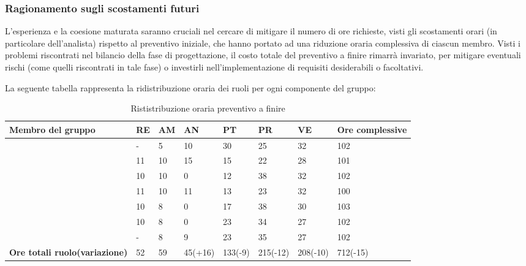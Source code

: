 \subsubsection{Ragionamento sugli scostamenti futuri}
L'esperienza e la coesione maturata saranno cruciali nel cercare di mitigare il numero di ore richieste, visti gli scostamenti orari (in particolare dell'analista) rispetto al preventivo iniziale, che hanno portato ad una riduzione oraria complessiva di ciascun membro.
Visti i problemi riscontrati nel bilancio della fase di progettazione, il costo totale del preventivo a finire rimarrà invariato, per mitigare eventuali rischi (come quelli riscontrati in tale fase) o investirli nell'implementazione di requisiti desiderabili o facoltativi.



La seguente tabella rappresenta la ridistribuzione oraria dei ruoli per ogni componente del gruppo:
\renewcommand{\arraystretch}{2}
\begin{longtable}[h!] { C{3.5cm} C{1cm} C{1cm} C{1cm} C{1cm} C{1cm} C{1cm} C{2cm}}
\caption{Rististribuzione oraria preventivo a finire}\\
\rowcolor{\primaryColor}

\textcolor{\secondaryColor}{\textbf{Membro del gruppo}} & 
\textcolor{\secondaryColor}{\textbf{RE}} & 
\textcolor{\secondaryColor}{\textbf{AM}} & 
\textcolor{\secondaryColor}{\textbf{AN}} & 
\textcolor{\secondaryColor}{\textbf{PT}} & 
\textcolor{\secondaryColor}{\textbf{PR}} & 
\textcolor{\secondaryColor}{\textbf{VE}} & 
\textcolor{\secondaryColor}{\textbf{Ore complessive}}\\	
\endhead
        
\AW{}                     & -  & 5 & 10 & 30 & 25 & 32 & 102 \\
\AT{}                     & 11 & 10 & 15& 15 & 22 & 28 & 101\\
\AD{}                     & 10 & 10 & 0 & 12 & 38 & 32 & 102 \\
\EC{}                     & 11 & 10 & 11& 13 & 23 & 32 & 100 \\
\EM{}                     & 10 & 8 & 0 & 17 & 38 & 30 & 103 \\
\FP{}                     & 10 & 8 & 0 & 23 & 34 & 27 & 102 \\
\GG{}                     & -  & 8 & 9 & 23 & 35 & 27 & 102 \\
\textbf{Ore totali ruolo(variazione)} & 52 & 59 & 45(+16) & 133(-9) & 215(-12) & 208(-10) & 712(-15) \\

		
\end{longtable}
